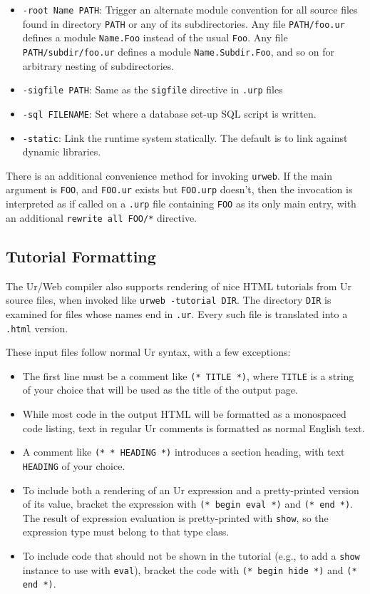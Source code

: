 \documentclass{article}
\newcommand{\cd}[1]{\texttt{#1}}
\begin{document}
\begin{itemize}
\item \texttt{-root Name PATH}: Trigger an alternate module convention for all source files found in directory \texttt{PATH} or any of its subdirectories.  Any file \texttt{PATH/foo.ur} defines a module \texttt{Name.Foo} instead of the usual \texttt{Foo}.  Any file \texttt{PATH/subdir/foo.ur} defines a module \texttt{Name.Subdir.Foo}, and so on for arbitrary nesting of subdirectories.

\item \texttt{-sigfile PATH}: Same as the \texttt{sigfile} directive in \texttt{.urp} files

\item \texttt{-sql FILENAME}: Set where a database set-up SQL script is written.

\item \texttt{-static}: Link the runtime system statically.  The default is to link against dynamic libraries.
\end{itemize}

There is an additional convenience method for invoking \texttt{urweb}.  If the main argument is \texttt{FOO}, and \texttt{FOO.ur} exists but \texttt{FOO.urp} doesn't, then the invocation is interpreted as if called on a \texttt{.urp} file containing \texttt{FOO} as its only main entry, with an additional \texttt{rewrite all FOO/*} directive.

\subsection{Tutorial Formatting}

The Ur/Web compiler also supports rendering of nice HTML tutorials from Ur source files, when invoked like \cd{urweb -tutorial DIR}.  The directory \cd{DIR} is examined for files whose names end in \cd{.ur}.  Every such file is translated into a \cd{.html} version.

These input files follow normal Ur syntax, with a few exceptions:
\begin{itemize}
\item The first line must be a comment like \cd{(* TITLE *)}, where \cd{TITLE} is a string of your choice that will be used as the title of the output page.
\item While most code in the output HTML will be formatted as a monospaced code listing, text in regular Ur comments is formatted as normal English text.
\item A comment like \cd{(* * HEADING *)} introduces a section heading, with text \cd{HEADING} of your choice.
\item To include both a rendering of an Ur expression and a pretty-printed version of its value, bracket the expression with \cd{(* begin eval *)} and \cd{(* end *)}.  The result of expression evaluation is pretty-printed with \cd{show}, so the expression type must belong to that type class.
\item To include code that should not be shown in the tutorial (e.g., to add a \cd{show} instance to use with \cd{eval}), bracket the code with \cd{(* begin hide *)} and \cd{(* end *)}.
\end{itemize}
\end{document}
